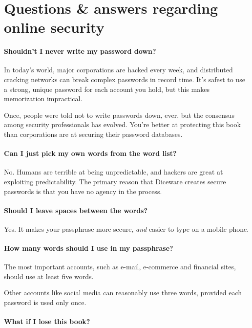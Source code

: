 \chapter*{Questions \& answers regarding online security}
\small
\label{ch:qna}

\subsubsection{Shouldn't I never write my password down?}

In today's world, major corporations are hacked every week, and distributed cracking networks can break complex passwords in record time. It's safest to use a strong, unique password for each account you hold, but this makes memorization impractical. 

Once, people were told not to write passwords down, ever, but the consensus among security professionals has evolved. You're better at protecting this book than corporations are at securing their password databases. 

\subsubsection{Can I just pick my own words from the word list?}

No. Humans are terrible at being unpredictable, and hackers are great at exploiting predictability. The primary reason that Diceware creates secure passwords is that you have no agency in the process.

\subsubsection{Should I leave spaces between the words?}

Yes. It makes your passphrase more secure, \textit{and} easier to type on a mobile phone.

\subsubsection{How many words should I use in my passphrase?}

The most important accounts, such as e-mail, e-commerce and financial sites, should use at least five words.

Other accounts like social media can reasonably use three words, provided each password is used only once.

\subsubsection{What if I lose this book?}

